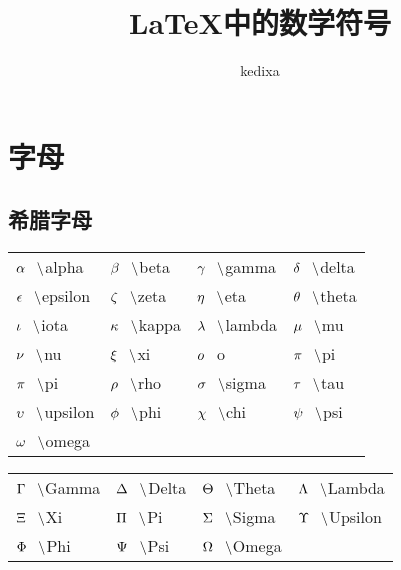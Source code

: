 \documentclass{ctexart}
\newcommand{\sihao}{\fontsize{14pt}{\baselineskip}\selectfont}
\newcommand{\pair}[2]{${#1} \hspace{0.3cm} \backslash ${#2}}
\newcommand{\nbpair}[2]{${#1} \hspace{0.3cm} ${#2}} %
\begin{document}
\title{\LaTeX 中的数学符号}
\author{kedixa}
\maketitle
\section{字母}
\subsection{希腊字母}
\sihao
\begin{tabular}{p{3cm}p{3cm}p{3cm}p{3cm}}
    \pair{\alpha}{alpha}     & \pair{\beta}{beta}   & \pair{\gamma}{gamma}   & \pair{\delta}{delta} \\
    \pair{\epsilon}{epsilon} & \pair{\zeta}{zeta}   & \pair{\eta}{eta}       & \pair{\theta}{theta} \\
    \pair{\iota}{iota}       & \pair{\kappa}{kappa} & \pair{\lambda}{lambda} & \pair{\mu}{mu}       \\
    \pair{\nu}{nu}           & \pair{\xi}{xi}       & \nbpair{o}{o}          & \pair{\pi}{pi}       \\
    \pair{\pi}{pi}           & \pair{\rho}{rho}     & \pair{\sigma}{sigma}   & \pair{\tau}{tau}     \\
    \pair{\upsilon}{upsilon} & \pair{\phi}{phi}     & \pair{\chi}{chi}       & \pair{\psi}{psi}     \\
    \pair{\omega}{omega}     &                      &                        &                      \\
\end{tabular}

\vspace{0.5cm}
\begin{tabular}{p{3cm}p{3cm}p{3cm}p{3cm}}
    \pair{\Gamma}{Gamma} & \pair{\Delta}{Delta} & \pair{\Theta}{Theta} & \pair{\Lambda}{Lambda}   \\
    \pair{\Xi}{Xi}       & \pair{\Pi}{Pi}       & \pair{\Sigma}{Sigma} & \pair{\Upsilon}{Upsilon} \\
    \pair{\Phi}{Phi}     & \pair{\Psi}{Psi}     & \pair{\Omega}{Omega} &                          \\
\end{tabular}
\end{document}
